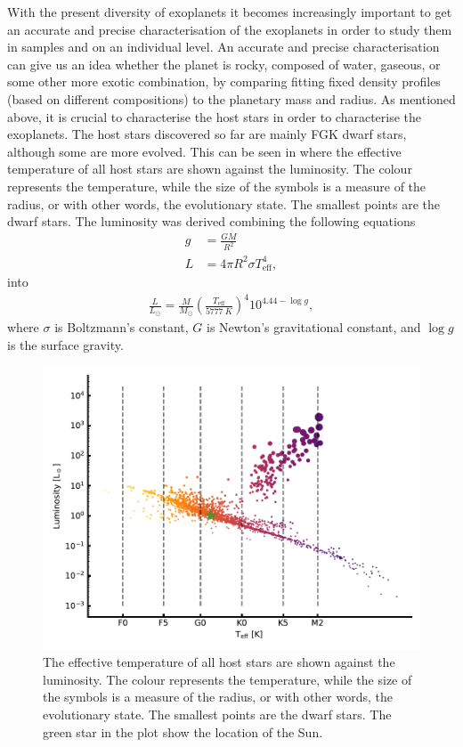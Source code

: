 With the present diversity of exoplanets it becomes increasingly important to get an accurate and
precise characterisation of the exoplanets in order to study them in samples and on an individual
level. An accurate and precise characterisation can give us an idea whether the planet is rocky,
composed of water, gaseous, or some other more exotic combination, by comparing fitting fixed
density profiles (based on different compositions) to the planetary mass and radius. As mentioned
above, it is crucial to characterise the host stars in order to characterise the exoplanets. The
host stars discovered so far are mainly FGK dwarf stars, although some are more evolved. This can be
seen in  where the effective temperature of all host stars are shown
against the luminosity. The colour represents the temperature, while the size of the symbols is a
measure of the radius, or with other words, the evolutionary state. The smallest points are the
dwarf stars. The luminosity was derived combining the following equations
\begin{align*}
  g &= \frac{GM}{R^2} \\
  L &= 4\pi R^2 \sigma T_\mathrm{eff}^4,
\end{align*}
into
\begin{align}
  \frac{L}{L_\odot} = \frac{M}{M_\odot} \left(\frac{T_\mathrm{eff}}{\SI{5777}{K}}\right)^4 10^{4.44-\log g},
\end{align}
where $\sigma$ is Boltzmann's constant, $G$ is Newton's gravitational constant, and $\log g$ is the
surface gravity.

\begin{figure}[htpb!]
    \centering
    \includegraphics[width=1.0\linewidth]{figures/hostDistribution.pdf}
    \caption{The effective temperature of all host stars are shown against the luminosity. The
             colour represents the temperature, while the size of the symbols is a measure of the
             radius, or with other words, the evolutionary state. The smallest points are the dwarf
             stars. The green star in the plot show the location of the Sun.}
    \label{fig:hostDistribution}
\end{figure}

